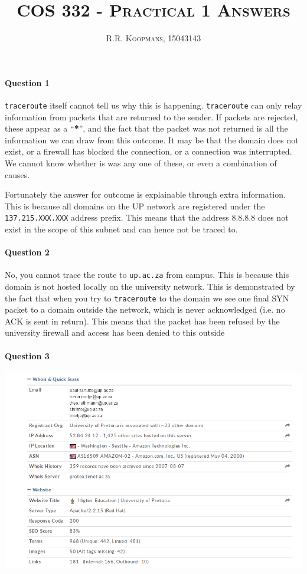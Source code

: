 \documentclass[12pt,a4paper]{article}
\title{\textsc{COS 332 - Practical 1 Answers}}
\author{\textsc{R.R. Koopmans, 15043143}}
\begin{document}
\maketitle

\paragraph{Question 1}

\texttt{traceroute} itself cannot tell us why this is happening.
\texttt{traceroute} can only relay information from packets that are returned to
the sender. If packets are rejected, these appear as a ``\textbf{*}'', and the fact
that the packet was not returned is all the information we can draw from this
outcome. It may be that the domain does not exist, or a firewall has blocked the
connection, or a connection was interrupted. We cannot know whether is was any
one of these, or even a combination of causes.

Fortunately the answer for outcome is explainable through extra information.
This is because all domains on the UP network are registered under the
\texttt{137.215.XXX.XXX} address prefix. This means that the address 8.8.8.8
does not exist in the scope of this subnet and can hence not be traced to.

\paragraph{Question 2}

No, you cannot trace the route to \texttt{up.ac.za} from campus. This is because
this domain is not hosted locally on the university network. This is
demonstrated by the fact that when you try to \texttt{traceroute} to the domain
we see one final SYN packet to a domain outside the network, which  is never
acknowledged (i.e. no ACK is sent in return). This means that the packet has
been refused by the university firewall and access has been denied to this
outside

\paragraph{Question 3}

\begin{center}
  \includegraphics[scale=0.5]{whoiscropped}
\end{center}
\end{document}
